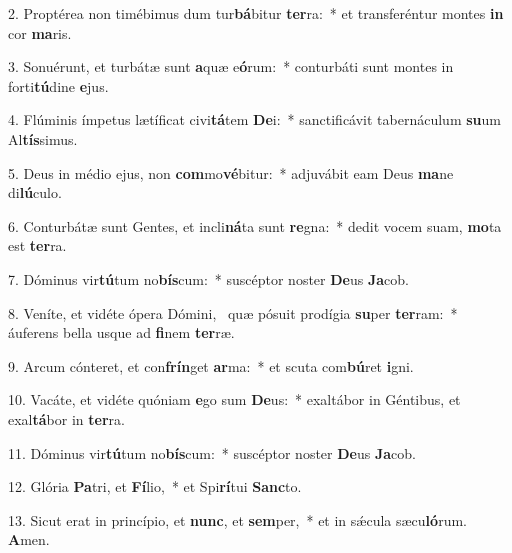 2. Proptérea non timébimus dum tur\textbf{bá}bitur \textbf{ter}ra:~*  et transferéntur montes \textbf{in} cor \textbf{ma}ris.\

3. Sonuérunt, et turbátæ sunt \textbf{a}quæ e\textbf{ó}rum:~*  conturbáti sunt montes in forti\textbf{tú}dine \textbf{e}jus.\

4. Flúminis ímpetus lætíficat civi\textbf{tá}tem \textbf{De}i:~*  sanctificávit tabernáculum \textbf{su}um Al\textbf{tís}simus.\

5. Deus in médio ejus, non \textbf{com}mo\textbf{vé}bitur:~*  adjuvábit eam Deus \textbf{ma}ne di\textbf{lú}culo.\

6. Conturbátæ sunt Gentes, et incli\textbf{ná}ta sunt \textbf{re}gna:~*  dedit vocem suam, \textbf{mo}ta est \textbf{ter}ra.\

7. Dóminus vir\textbf{tú}tum no\textbf{bís}cum:~*  suscéptor noster \textbf{De}us \textbf{Ja}cob.\

8. Veníte, et vidéte ópera Dómini, \dag\  quæ pósuit prodígia \textbf{su}per \textbf{ter}ram:~*  áuferens bella usque ad \textbf{fi}nem \textbf{ter}ræ.\

9. Arcum cónteret, et con\textbf{frín}get \textbf{ar}ma:~*  et scuta com\textbf{bú}ret \textbf{i}gni.\

10. Vacáte, et vidéte quóniam \textbf{e}go sum \textbf{De}us:~*  exaltábor in Géntibus, et exal\textbf{tá}bor in \textbf{ter}ra.\

11. Dóminus vir\textbf{tú}tum no\textbf{bís}cum:~*  suscéptor noster \textbf{De}us \textbf{Ja}cob.\

12. Glória \textbf{Pa}tri, et \textbf{Fí}lio,~*  et Spi\textbf{rí}tui \textbf{Sanc}to.\

13. Sicut erat in princípio, et \textbf{nunc}, et \textbf{sem}per,~*  et in sǽcula sæcu\textbf{ló}rum. \textbf{A}men.\

